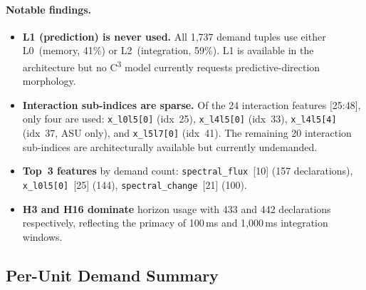 \paragraph{Notable findings.}
\begin{itemize}\itemsep1pt
  \item \textbf{L1 (prediction) is never used.}
        All 1{,}737 demand tuples use either L0~(memory, 41\%)
        or L2~(integration, 59\%).
        L1 is available in the architecture but no C\textsuperscript{3}
        model currently requests predictive-direction morphology.
  \item \textbf{Interaction sub-indices are sparse.}
        Of the 24 interaction features [25:48], only four are used:
        \texttt{x\_l0l5[0]} (idx~25), \texttt{x\_l4l5[0]} (idx~33),
        \texttt{x\_l4l5[4]} (idx~37, ASU only), and
        \texttt{x\_l5l7[0]} (idx~41).
        The remaining 20 interaction sub-indices are architecturally
        available but currently undemanded.
  \item \textbf{Top~3 features} by demand count:
        \texttt{spectral\_flux}~[10] (157 declarations),
        \texttt{x\_l0l5[0]}~[25] (144),
        \texttt{spectral\_change}~[21] (100).
  \item \textbf{H3 and H16 dominate} horizon usage with 433 and 442
        declarations respectively, reflecting the primacy of
        100\,ms and 1{,}000\,ms integration windows.
\end{itemize}


\subsection{Per-Unit Demand Summary}
\label{subsec:routing-per-unit}

